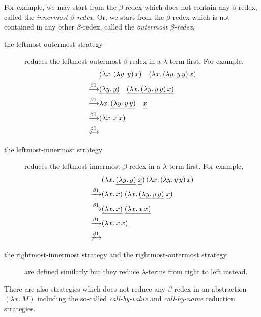 For example, we may start from the $\beta$-redex which does not contain
any $\beta$-redex, called the \emph{innermost $\beta$-redex}. Or, we start from
the $\beta$-redex which is not contained in any other $\beta$-redex, called the
\emph{outermost $\beta$-redex}. 
\begin{description}
  \item[the leftmost-outermost strategy] reduces the leftmost outermost
    $\beta$-redex in a $\lambda$-term first. For example, 
    \begin{align*}
      & 
      \underline{(\lambda x.\, (\lambda y.\, y)\,x)}\quad
      \underline{(\lambda x.\, (\lambda y.\, y\,y)\,x)}
      \\
      \xrightarrow{\beta1} &
      \underline{(\lambda y.\, y)}\quad
      \underline{(\lambda x.\, (\lambda y.\, y\,y)\, x)} \\
      \xrightarrow{\beta1} &
      \lambda x.\, \underline{(\lambda y.\, y\,y)}\quad
      \underline{\vphantom{(\lambda}x} \\
      \xrightarrow{\beta1} & (\lambda x.\, x\,x) \\
      \not\xrightarrow{\beta1}
    \end{align*}
  \item[the leftmost-innermost strategy] reduces the leftmost innermost
    $\beta$-redex in a $\lambda$-term first. For example, 
    \begin{align*}
      & (\lambda x.\, \underline{(\lambda y.\,
        y)}\;\underline{\vphantom{(\lambda} x})\,
      (\lambda x.\, (\lambda y.\, y\, y)\,x) \\
      \xrightarrow{\beta1} & (\lambda x.\,x)\;
      (\lambda x.\, \underline{(\lambda y.\, y\,
        y)}\;\underline{\vphantom{(\lambda}x}) \\
      \xrightarrow{\beta1} & \underline{(\lambda x.\,x)}\;\underline{(\lambda x.\, x\,x)} \\
      \xrightarrow{\beta1} & (\lambda x.\, x\, x) \\
      \not\xrightarrow{\beta1}
    \end{align*}
  \item[the rightmost-innermost strategy and the rightmost-outermost strategy]
    are defined similarly but they reduce $\lambda$-terms from right to left
    instead.
\end{description}
There are also strategies which does not reduce any $\beta$-redex in an
abstraction~$(\lambda x.\, M)$ including the so-called
\emph{call-by-value} and \emph{call-by-name} reduction strategies.

